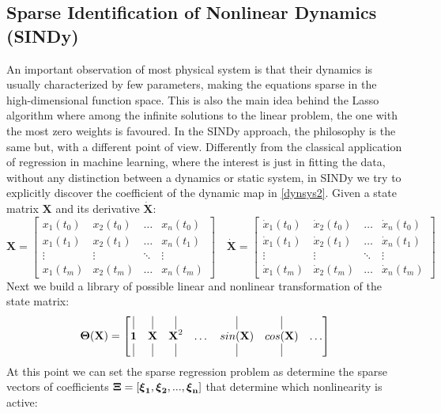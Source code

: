 \documentclass[]{article}
\begin{document}
\subsection{Sparse Identification of  Nonlinear Dynamics (SINDy)}
An important observation of most physical system is that their dynamics is usually characterized by few parameters, making the equations sparse in the high-dimensional function space. This is also the main idea behind the Lasso algorithm where among the infinite solutions to the linear problem, the one with the most zero weights is favoured. In the SINDy approach, the philosophy is the same but, with a different point of view. Differently from the classical application of regression in machine learning, where the interest is just in fitting the data, without any distinction between a dynamics or static system, in SINDy we try to explicitly discover the coefficient of the dynamic map in \eqref{dynsys2}. Given a state matrix $\textbf{X}$ and its derivative $\dot{\textbf{X}}$:
\begin{equation}
\textbf{X} = 
\begin{bmatrix}
	x_1(t_0) & x_2(t_0) & \dots &  x_n(t_0)\\
	x_1(t_1) & x_2(t_1) & \dots &  x_n(t_1)\\
	\vdots &  \vdots & \ddots &  \vdots \\
	x_1(t_m) & x_2(t_m) & \dots &  x_n(t_m) 
	\end{bmatrix} 
	\quad
	\dot{\textbf{X}} = 
	\begin{bmatrix}
	\dot x_1(t_0) & \dot x_2(t_0) & \dots &  \dot x_n(t_0)\\
	\dot x_1(t_1) & \dot x_2(t_1) & \dots &  \dot x_n(t_1)\\
	\vdots &  \vdots & \ddots &  \vdots \\
	\dot x_1(t_m) & \dot x_2(t_m) & \dots &  \dot x_n(t_m) 
\end{bmatrix}
\end{equation}
Next we build a library of possible linear and  nonlinear transformation of the state matrix:
\begin{equation}
\bf{\Theta}(\textbf{X}) = 
\begin{bmatrix}
\vline & \vline & \vline &  &  \vline & \vline & \\
\textbf{1} & \textbf{X} & \textbf{X}^2 & \dots & sin(\textbf{X}) & cos(\textbf{X}) & \dots \\
\vline & \vline & \vline &  & \vline & \vline & 
\end{bmatrix}
\end{equation}
At this point we can set the sparse regression problem as determine the sparse vectors of coefficients $\bf\Xi = [\boldsymbol\xi_1, \boldsymbol\xi_2, ..., \boldsymbol\xi_n]$ that determine which nonlinearity is active:
\end{document}
